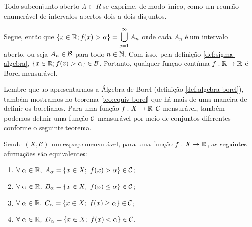 	\begin{theorem}
		\label{teo:estrutura-abertos-reta}
		Todo subconjunto aberto $A \subset R$ se exprime, de modo único, como um reunião enumerável de intervalos abertos dois a dois disjuntos.
	\end{theorem}
	Segue, então que 
	$\{x \in \mathbb{R}; f(x) > \alpha\} = \displaystyle \bigcup_{j = 1}^\infty A_n$ onde cada $A_n$ é um intervalo aberto, ou seja $A_n \in \operatorname{\mathcal{B}}$ para todo $n \in \operatorname{\mathbb{N}}$.
	Com isso, pela definição \ref{def:sigma-algebra}, $\{x \in \mathbb{R}; f(x) > \alpha\} \in \operatorname{\mathcal{B}}$.
	Portanto, qualquer função contínua $f: \mathbb{R} \to \mathbb{R}$ é Borel mensurável.


    Lembre que ao apresentarmos a Álgebra de Borel (definição \ref{def:algebra-borel}), também mostramos no teorema \ref{teo:equiv-borel} que há mais de uma maneira de definir os borelianos.
    Para uma função $f: X \to \mathbb{R}$ $\operatorname{\mathcal{C}}$-mensurável, também podemos definir uma função $\operatorname{\mathcal{C}}$-mensurável por meio de conjuntos diferentes conforme o seguinte teorema.

\begin{theorem}
\label{teo:equiv-funcoes-mensuraveis}
    Sendo $(X,\mathcal{C})$ um espaço mensurável, para uma função $f: X \to \mathbb{R}$, as seguintes afirmações são equivalentes:
    \begin{multicols}{2}
        
    \begin{enumerate}[label=(\alph*)]
        \item $\forall \ \alpha \in \mathbb{R}, \ A_\alpha =\{x \in X;\ f(x) > \alpha \} \in \mathcal{C}$;
        \item $\forall \ \alpha \in \mathbb{R}, \ B_\alpha =\{x \in X;\ f(x) \leq \alpha \} \in \mathcal{C}$;
        \item $\forall \ \alpha \in \mathbb{R}, \ C_\alpha =\{x \in X;\ f(x) \geq \alpha \} \in \mathcal{C}$;
        \item $\forall \ \alpha \in \mathbb{R}, \ D_\alpha =\{x \in X;\ f(x) < \alpha \} \in \mathcal{C}$.
    \end{enumerate}
     \end{multicols}

\end{theorem}

